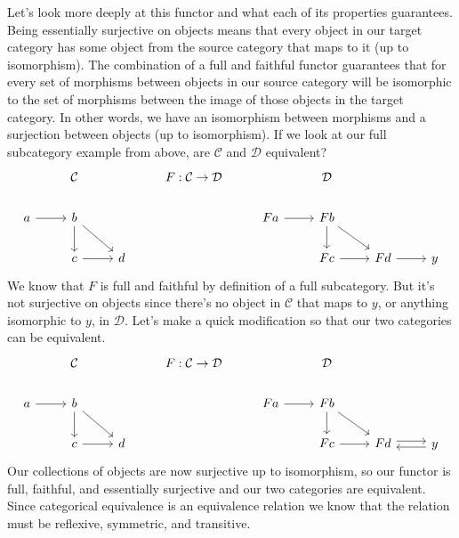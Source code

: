\documentclass[12pt]{article}
\theoremstyle{definition}
\begin{document}
Let's look more deeply at this functor and what each of its properties guarantees.
Being essentially surjective on objects means that every object in our target category has some object from the source category that maps to it (up to isomorphism).
The combination of a full and faithful functor guarantees that for every set of morphisms between objects in our source category will be isomorphic to the set of morphisms between the image of those objects in the target category.
In other words, we have an isomorphism between morphisms and a surjection between objects (up to isomorphism).
If we look at our full subcategory example from above, are $\mathcal{C}$ and $\mathcal{D}$ equivalent?
\[\begin{tikzcd}
        & {\mathcal{C}} && {F:\mathcal{C}\rightarrow\mathcal{D}} && {\mathcal{D}} \\
        a & b &&& Fa & Fb \\
        & c & d &&& Fc & Fd & y
        \arrow[from=2-1, to=2-2]
        \arrow[from=2-2, to=3-2]
        \arrow[from=3-2, to=3-3]
        \arrow[from=2-2, to=3-3]
        \arrow[from=2-5, to=2-6]
        \arrow[from=2-6, to=3-7]
        \arrow[from=3-6, to=3-7]
        \arrow[from=2-6, to=3-6]
        \arrow[from=3-7, to=3-8]
    \end{tikzcd}\]
We know that $F$ is full and faithful by definition of a full subcategory.
But it's not surjective on objects since there's no object in $\mathcal{C}$ that maps to $y$, or anything isomorphic to $y$, in $\mathcal{D}$.
Let's make a quick modification so that our two categories can be equivalent.
\[\begin{tikzcd}
        & {\mathcal{C}} && {F:\mathcal{C}\rightarrow\mathcal{D}} && {\mathcal{D}} \\
        a & b &&& Fa & Fb \\
        & c & d &&& Fc & Fd & y
        \arrow[from=2-1, to=2-2]
        \arrow[from=2-2, to=3-2]
        \arrow[from=3-2, to=3-3]
        \arrow[from=2-2, to=3-3]
        \arrow[from=2-5, to=2-6]
        \arrow[from=2-6, to=3-7]
        \arrow[from=3-6, to=3-7]
        \arrow[from=2-6, to=3-6]
        \arrow[shift left, from=3-7, to=3-8]
        \arrow[shift left, from=3-8, to=3-7]
    \end{tikzcd}\]
Our collections of objects are now surjective up to isomorphism, so our functor is full, faithful, and essentially surjective and our two categories are equivalent.
Since categorical equivalence is an equivalence relation we know that the relation must be reflexive, symmetric, and transitive.
\end{document}

